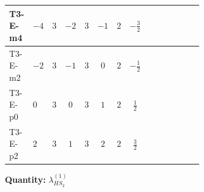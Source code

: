 \documentclass[8pt]{article}
\begin{document}
\begin{landscape}
\begin{longtable}{@{}llcccccc >{\raggedright\arraybackslash}p{0.21\linewidth} >{\raggedright\arraybackslash}p{0.21\linewidth} >{\raggedright\arraybackslash}p{0.21\linewidth}@{}}
T3-E-m4 & $-4$ & $3$ & $-2$ & $3$ & $-1$ & $2$ & $-\frac{3}{2}$ & \scriptsize\adjustbox{max width=\linewidth}{$\begin{gathered} +4 {\lambda_{HS_2}^{(1)}}^2\end{gathered}$} & \scriptsize\adjustbox{max width=\linewidth}{$\begin{gathered} +8 {\lambda_{HS_2}^{(1)}} {\lambda_{S_2}^{(1)}}\end{gathered}$} & \scriptsize\adjustbox{max width=\linewidth}{$\begin{gathered} +6 {\lambda_{HS_2}^{(A)}}^2\end{gathered}$} \\
\midrule
T3-E-m2 & $-2$ & $3$ & $-1$ & $3$ & $0$ & $2$ & $-\frac{1}{2}$ & \scriptsize\adjustbox{max width=\linewidth}{$\begin{gathered} +4 {\lambda_{HS_2}^{(1)}}^2\end{gathered}$} & \scriptsize\adjustbox{max width=\linewidth}{$\begin{gathered} +8 {\lambda_{HS_2}^{(1)}} {\lambda_{S_2}^{(1)}}\end{gathered}$} & \scriptsize\adjustbox{max width=\linewidth}{$\begin{gathered} +6 {\lambda_{HS_2}^{(A)}}^2\end{gathered}$} \\
\midrule
T3-E-p0 & $0$ & $3$ & $0$ & $3$ & $1$ & $2$ & $\frac{1}{2}$ & \scriptsize\adjustbox{max width=\linewidth}{$\begin{gathered} +4 {\lambda_{HS_2}^{(1)}}^2\end{gathered}$} & \scriptsize\adjustbox{max width=\linewidth}{$\begin{gathered} +8 {\lambda_{HS_2}^{(1)}} {\lambda_{S_2}^{(1)}}\end{gathered}$} & \scriptsize\adjustbox{max width=\linewidth}{$\begin{gathered} +6 {\lambda_{HS_2}^{(A)}}^2\end{gathered}$} \\
\midrule
T3-E-p2 & $2$ & $3$ & $1$ & $3$ & $2$ & $2$ & $\frac{3}{2}$ & \scriptsize\adjustbox{max width=\linewidth}{$\begin{gathered} +4 {\lambda_{HS_2}^{(1)}}^2\end{gathered}$} & \scriptsize\adjustbox{max width=\linewidth}{$\begin{gathered} +8 {\lambda_{HS_2}^{(1)}} {\lambda_{S_2}^{(1)}}\end{gathered}$} & \scriptsize\adjustbox{max width=\linewidth}{$\begin{gathered} +6 {\lambda_{HS_2}^{(A)}}^2\end{gathered}$} \\
\midrule
\bottomrule
\end{longtable}
\clearpage
\noindent\textbf{Quantity: }$\lambda_{HS_2}^{(1)}$\par\smallskip

\end{landscape}
\end{document}

